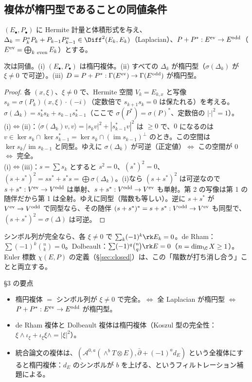 \subsection{複体が楕円型であることの同値条件}
$(E_\bullet,P_\bullet)$ に Hermite 計量と体積形式を与え、$\Delta_k=P_k^*P_k+P_{k-1}P_{k-1}^*\in\Diff^2(E_k,E_k)$（Laplacian）、$P+P^*:E^{\rm ev}\to E^{\rm odd}$（$E^{\rm ev}=\bigoplus_{k\ \rm even}E_k$）とする。
\begin{prop}\label{prop:cxequiv}\tP
次は同値。(i) $(E_\bullet,P_\bullet)$ は楕円複体。(ii) すべての $\Delta_k$ が楕円型（$\sigma(\Delta_k)$ が $\xi\ne0$ で可逆）。(iii) $D=P+P^*:\Gamma(E^{\rm ev})\to\Gamma(E^{\rm odd})$ が楕円型。
\end{prop}
\begin{proof}
各 $(x,\xi)$、$\xi\neq0$ で、Hermite 空間 $V_k=E_{k,x}$ と写像 $s_k=\sigma(P_k)(x,\xi)\cdot(-i)$（定数倍で $s_{k+1}s_k=0$ は保たれる）を考える。$\sigma(\Delta_k)=s_k^*s_k+s_{k-1}s_{k-1}^*$（ここで $\sigma(P^*)=\sigma(P)^*$、定数倍の $|\cdot|^2=1$）。\\
(i)$\iff$(ii)：$\langle\sigma(\Delta_k)v,v\rangle=|s_kv|^2+|s_{k-1}^*v|^2$ は $\ge0$ で、$0$ になるのは $v\in\ker s_k\cap\ker s_{k-1}^*=\ker s_k\cap(\operatorname{im}s_{k-1})^\perp$ のとき。この空間は $\ker s_k/\operatorname{im}s_{k-1}$ と同型。ゆえに $\sigma(\Delta_k)$ が可逆（正定値）$\iff$ この空間が $0$ $\iff$ 完全。\\
(i)$\iff$(iii)：$s=\sum s_k$ とすると $s^2=0$、$(s^*)^2=0$、$(s+s^*)^2=ss^*+s^*s=\bigoplus\sigma(\Delta_k)$。(i)なら $(s+s^*)^2$ は可逆なので $s+s^*:V^{\rm ev}\to V^{\rm odd}$ は単射、$s+s^*:V^{\rm odd}\to V^{\rm ev}$ も単射。第 2 の写像は第 1 の随伴だから第 1 は全射。ゆえに同型（階数も等しい）。逆に $s+s^*$ が $V^{\rm ev}\to V^{\rm odd}$ で同型なら、その随伴 $(s+s^*)^*=s+s^*:V^{\rm odd}\to V^{\rm ev}$ も同型で、$(s+s^*)^2=\sigma(\Delta)$ は可逆。
\end{proof}
\begin{rem}[階数の交代和]\label{rem:rankalt}
シンボル列が完全なら、各 $\xi\neq0$ で $\sum_k(-1)^k\rk E_k=0$。de Rham：$\sum(-1)^k\binom nk=0$。Dolbeault：$\sum(-1)^q\binom{n}{q}\rk E=0$（$n=\dim_\C X\ge1$）。Euler 標数 $\chi(E,P)$ の定義（\S\ref{sec:closed}）は、この「階数が打ち消し合う」ことと両立する。
\end{rem}
\begin{keybox}{§3 の要点}
\begin{itemize}
\item 楕円複体 $=$ シンボル列が $\xi\ne0$ で完全。$\iff$ 全 Laplacian が楕円型 $\iff$ $P+P^*:E^{\rm ev}\to E^{\rm odd}$ が楕円型。
\item de Rham 複体と Dolbeault 複体は楕円複体（Koszul 型の完全性：$\xi\wedge\iota_\xi+\iota_\xi\xi\wedge=|\xi|^2$）。
\item 統合論文の複体は、$(\mathcal A^{0,a}(\wedge^bT\otimes E),\bar\partial+(-1)^ad_E)$ という全複体にすると楕円複体：$d_E$ のシンボルが $b$ を上げる、というフィルトレーション補題による。
\end{itemize}
\end{keybox}
